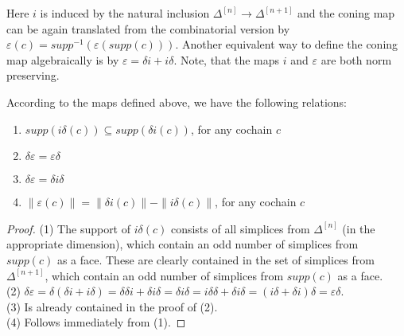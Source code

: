 

Here \(i\) is induced by the natural inclusion \(\Delta^{[n]}\rightarrow\Delta^{[n+1]}\) and the coning map can be again translated from the combinatorial version by \(\varepsilon(c)=supp^{-1}(\varepsilon(supp(c)))\). Another equivalent way to define the coning map algebraically is by \(\varepsilon=\delta i+i\delta\). Note, that the maps \(i\) and \(\varepsilon\) are both norm preserving.

\begin{lem}\label{lemma9}
According to the maps defined above, we have the following relations:
\begin{enumerate}
\item \(supp(i\delta(c))\subseteq supp(\delta i(c))\), for any cochain \(c\)
\item \(\delta\varepsilon=\varepsilon\delta\)
\item \(\delta\varepsilon=\delta i\delta\)
\item \(\|\varepsilon(c)\|=\|\delta i(c)\|-\|i\delta(c)\|\), for any cochain \(c\)
\end{enumerate}
\begin{proof}
(1) The support of \(i\delta(c)\) consists of all simplices from \(\Delta^{[n]}\) (in the appropriate dimension), which contain an odd number of simplices from \(supp(c)\) as a face. These are clearly contained in the set of simplices from \(\Delta^{[n+1]}\), which contain an odd number of simplices from \(supp(c)\) as a face.\\
(2) \(\delta\varepsilon=\delta(\delta i + i\delta)=\delta\delta i + \delta i \delta=\delta i\delta=i\delta\delta + \delta i\delta=(i\delta + \delta i)\delta = \varepsilon\delta\).\\
(3) Is already contained in the proof of (2).\\
(4) Follows immediately from (1).
\end{proof}
\end{lem}

